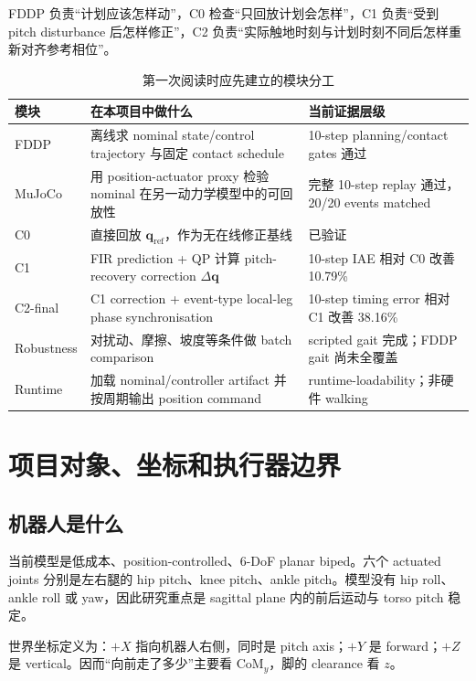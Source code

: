 \documentclass[UTF8,11pt,a4paper]{ctexart}
\begin{document}
FDDP 负责“计划应该怎样动”，C0 检查“只回放计划会怎样”，C1 负责“受到 pitch disturbance 后怎样修正”，C2 负责“实际触地时刻与计划时刻不同后怎样重新对齐参考相位”。

\begin{table}[htbp]
\centering
\caption{第一次阅读时应先建立的模块分工}
\begin{tabularx}{\linewidth}{@{}p{2.25cm}X p{3.0cm}@{}}
\toprule
模块 & 在本项目中做什么 & 当前证据层级 \\
\midrule
FDDP & 离线求 nominal state/control trajectory 与固定 contact schedule & 10-step planning/contact gates 通过 \\
MuJoCo & 用 position-actuator proxy 检验 nominal 在另一动力学模型中的可回放性 & 完整 10-step replay 通过，20/20 events matched \\
C0 & 直接回放 $\bm q_{\mathrm{ref}}$，作为无在线修正基线 & 已验证 \\
C1 & FIR prediction + QP 计算 pitch-recovery correction $\Delta\bm q$ & 10-step IAE 相对 C0 改善 10.79\% \\
C2-final & C1 correction + event-type local-leg phase synchronisation & 10-step timing error 相对 C1 改善 38.16\% \\
Robustness & 对扰动、摩擦、坡度等条件做 batch comparison & scripted gait 完成；FDDP gait 尚未全覆盖 \\
Runtime & 加载 nominal/controller artifact 并按周期输出 position command & runtime-loadability；非硬件 walking \\
\bottomrule
\end{tabularx}
\end{table}

\section{项目对象、坐标和执行器边界}\label{sec:robot}

\subsection{机器人是什么}

当前模型是低成本、position-controlled、6-DoF planar biped。六个 actuated joints 分别是左右腿的 hip pitch、knee pitch、ankle pitch。模型没有 hip roll、ankle roll 或 yaw，因此研究重点是 sagittal plane 内的前后运动与 torso pitch 稳定。

世界坐标定义为：$+X$ 指向机器人右侧，同时是 pitch axis；$+Y$ 是 forward；$+Z$ 是 vertical。因而“向前走了多少”主要看 $\mathrm{CoM}_y$，脚的 clearance 看 $z$。
\end{document}
